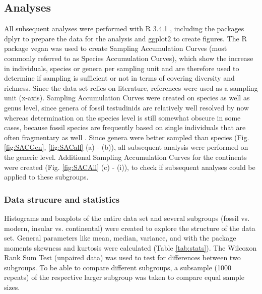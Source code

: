 \subsection{Analyses}
All subsequent analyses were performed with R 3.4.1 \citep{RCoreTeam2017}, including the packages dplyr \citep{Wickham2017} to prepare the data for the analysis and ggplot2 \citep{Wickham2009} to create figures. The R package vegan \citep{Oksanen2017} was used to create Sampling Accumulation Curves (most commonly referred to as Species Accumulation Curves), which show the increase in individuals, species or genera per sampling unit and are therefore used to determine if sampling is sufficient or not in terms of covering diversity and richness. 
Since the data set relies on literature, references were used as a sampling unit (x-axis).%
Sampling Accumulation Curves were created on species as well as genus level, since genera of fossil testudinids are relatively well resolved by now whereas determination on the species level is still somewhat obscure in some cases, because fossil species are frequently based on single individuals that are often fragmentary as well \citep{Brattstrom1961}. Since genera were better sampled than species (Fig. \ref{fig:SACGen}, \ref{fig:SACall} (a) - (b)), all subsequent analysis were performed on the generic level.
Additional Sampling Accumulation Curves for the continents were created (Fig. \ref{fig:SACAll} (c) -  (i)), to check if subsequent analyses could be applied to these subgroups. 

\subsubsection{Data strucure and statistics}
Histograms and boxplots of the entire data set and several subgroups (fossil vs. modern, insular vs. continental) were created to explore the structure of the data set. General parameters like mean, median, variance, and with the package moments \citep{Komsta2015} skewness and kurtosis were calculated (Table \ref{tab:stats}). The Wilcoxon Rank Sum Test (unpaired data) was used to test for differences between two subgroups. To be able to compare different subgroups, a subsample (1000 repeats) of the respective larger subgroup was taken to compare equal sample sizes. 



